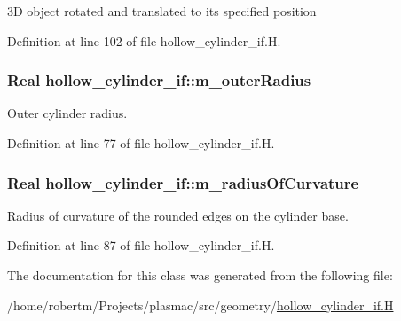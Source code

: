 3D object rotated and translated to its specified position 



Definition at line 102 of file hollow\+\_\+cylinder\+\_\+if.\+H.

\subsubsection[{\texorpdfstring{m\+\_\+outer\+Radius}{m_outerRadius}}]{\setlength{\rightskip}{0pt plus 5cm}Real hollow\+\_\+cylinder\+\_\+if\+::m\+\_\+outer\+Radius\hspace{0.3cm}{\ttfamily [protected]}}\hypertarget{classhollow__cylinder__if_a3971c8a329b24ffc355e34c513f7984c}{}\label{classhollow__cylinder__if_a3971c8a329b24ffc355e34c513f7984c}


Outer cylinder radius. 



Definition at line 77 of file hollow\+\_\+cylinder\+\_\+if.\+H.

\subsubsection[{\texorpdfstring{m\+\_\+radius\+Of\+Curvature}{m_radiusOfCurvature}}]{\setlength{\rightskip}{0pt plus 5cm}Real hollow\+\_\+cylinder\+\_\+if\+::m\+\_\+radius\+Of\+Curvature\hspace{0.3cm}{\ttfamily [protected]}}\hypertarget{classhollow__cylinder__if_a1c19d8a4dd90ad0b39610295d22472d4}{}\label{classhollow__cylinder__if_a1c19d8a4dd90ad0b39610295d22472d4}


Radius of curvature of the rounded edges on the cylinder base. 



Definition at line 87 of file hollow\+\_\+cylinder\+\_\+if.\+H.



The documentation for this class was generated from the following file\+:\begin{DoxyCompactItemize}
\item 
/home/robertm/\+Projects/plasmac/src/geometry/\hyperlink{hollow__cylinder__if_8H}{hollow\+\_\+cylinder\+\_\+if.\+H}\end{DoxyCompactItemize}
